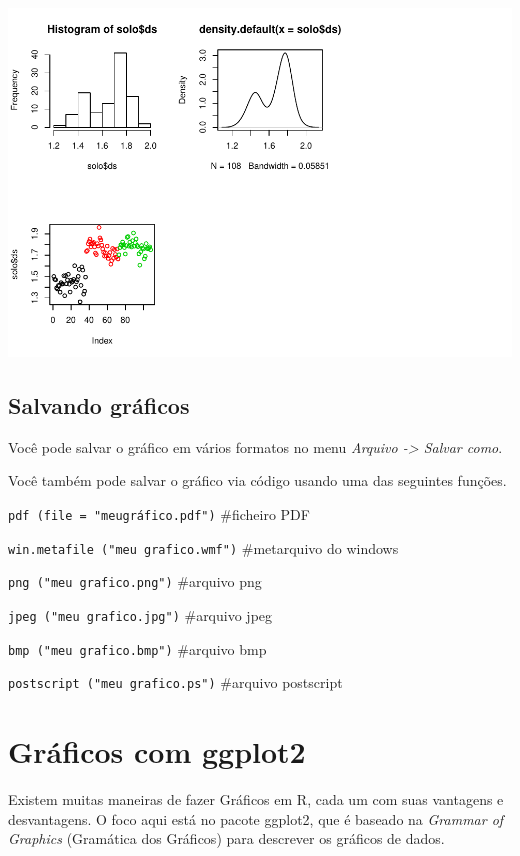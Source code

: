 \documentclass[
]{book}
\begin{document}
\includegraphics{TudodoR_files/figure-latex/unnamed-chunk-181-2.pdf}

\hypertarget{salvando-gruxe1ficos}{%
\section{Salvando gráficos}\label{salvando-gruxe1ficos}}

Você pode salvar o gráfico em vários formatos no menu
\emph{Arquivo -\textgreater{} Salvar como}.

Você também pode salvar o gráfico via código usando uma das seguintes funções.

\texttt{pdf\ (file\ =\ "meugráfico.pdf")} \#ficheiro PDF

\texttt{win.metafile\ ("meu\ grafico.wmf")} \#metarquivo do windows

\texttt{png\ ("meu\ grafico.png")} \#arquivo png

\texttt{jpeg\ ("meu\ grafico.jpg")} \#arquivo jpeg

\texttt{bmp\ ("meu\ grafico.bmp")} \#arquivo bmp

\texttt{postscript\ ("meu\ grafico.ps")} \#arquivo postscript

\hypertarget{gruxe1ficos-com-ggplot2}{%
\chapter{Gráficos com ggplot2}\label{gruxe1ficos-com-ggplot2}}

Existem muitas maneiras de fazer Gráficos em R, cada um com suas vantagens e desvantagens. O foco aqui está no pacote ggplot2, que é baseado na \emph{Grammar of Graphics} (Gramática dos Gráficos) para descrever os gráficos de dados.
\end{document}
